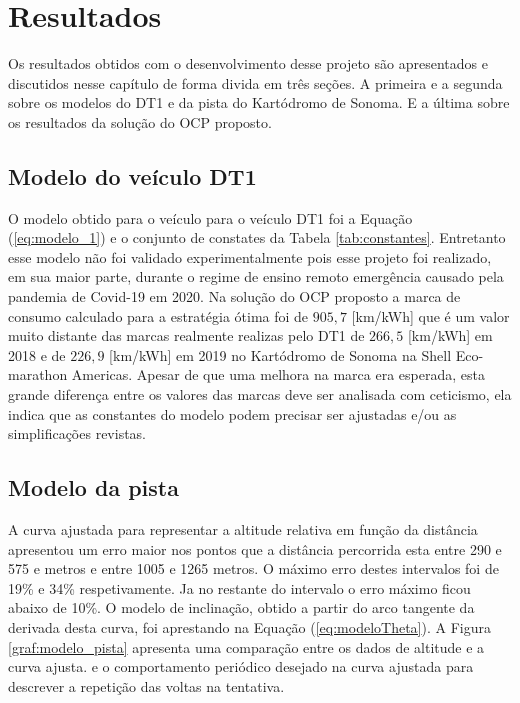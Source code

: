 \chapter{Resultados}
\label{chap:resultados}

Os resultados obtidos com o desenvolvimento desse projeto são apresentados e discutidos nesse capítulo de forma divida em três seções.  
A primeira e a segunda sobre os modelos do DT1 e da pista do Kartódromo de Sonoma. E a última  sobre os resultados da solução do OCP proposto.

\section{Modelo do veículo DT1}
\label{sec:resultados_modelo}

O modelo obtido para o veículo para o veículo DT1 foi a Equação (\ref{eq:modelo_1}) e o conjunto de constates da Tabela \ref{tab:constantes}.
Entretanto esse modelo não foi validado experimentalmente pois esse projeto foi realizado, em sua maior parte, durante o regime de ensino remoto
emergência causado pela pandemia de Covid-19 em 2020. Na solução do OCP proposto a marca de consumo calculado para a estratégia ótima
foi de $905,7$ [km/kWh] que é um valor muito distante das marcas realmente realizas pelo DT1 de $266,5$ [km/kWh] em 2018 e de $226,9$ [km/kWh] em 2019  no Kartódromo de Sonoma na Shell Eco-marathon Americas. 
Apesar de que uma melhora na marca era esperada, esta grande diferença entre os valores das marcas deve ser analisada com ceticismo, ela indica que as constantes do modelo podem precisar ser ajustadas e/ou as simplificações revistas.


\section{Modelo da pista}
\label{sec:resultados_pista}

A curva ajustada para representar a altitude relativa em função da distância  apresentou um erro maior nos pontos que a distância  percorrida esta entre 290 e 575 e metros e entre 1005 e 1265 metros. O máximo erro destes
intervalos foi de 19\% e 34\% respetivamente. Ja no restante do intervalo o erro máximo ficou abaixo de 10\%. 
O modelo de inclinação, obtido a partir do arco  tangente da derivada desta curva, foi aprestando na Equação (\ref{eq:modeloTheta}). 
A Figura \ref{graf:modelo_pista} apresenta uma comparação entre os dados de altitude e a curva ajusta.
e o comportamento periódico desejado na curva ajustada para descrever a repetição das voltas na tentativa.

